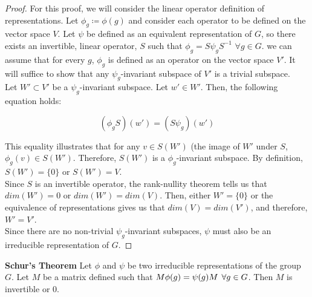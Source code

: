\begin{proof}For this proof, we will consider the linear operator definition of representations. Let $\phi_g \coloneq \phi(g)$ and consider each operator to be defined on the vector space $V$. Let $\psi$ be defined as an equivalent representation of $G$, so there exists an invertible, linear operator, $S$ such that $\phi_g = S\psi_g S^{-1}$ $\forall g \in G$. we can assume that for every $g$, $\phi_g$ is defined as an operator on the vector space $V'$. It will suffice to show that any $\psi_g$-invariant subspace of $V'$ is a trivial subspace. \\

Let $W' \subset V'$ be a $\psi_g$-invariant subspace. Let $w' \in W'$. Then, the following equation holds:

$$(\phi_gS)(w') = (S\psi_g)(w')$$

This equality illustrates that for any $v \in S(W')$ (the image of $W'$ under $S$, $\phi_g (v) \in S(W')$. Therefore, $S(W')$ is a $\phi_g$-invariant subspace. By definition, $S(W') = \{0\}$ or $S(W') = V$. \\

Since $S$ is an invertible operator, the rank-nullity theorem tells us that $dim(W')=0$ or $dim(W') = dim(V)$. Then, either $W' = \{0\}$ or the equivalence of representations gives us that $dim(V)=dim(V')$, and therefore, $W' = V'$. \\

Since there are no non-trivial $\psi_g$-invariant subspaces, $\psi$ must also be an irreducible representation of $G$. \end{proof}



\begin{theorem} \textbf{Schur's Theorem}
	Let $\phi$ and $\psi$ be two irreducible representations of the group $G$. Let $M$ be a matrix defined such that $M\phi(g) = \psi(g)M \hspace{1.5mm}\forall g \in G$. Then $M$ is invertible or $0$. 
\end{theorem}

